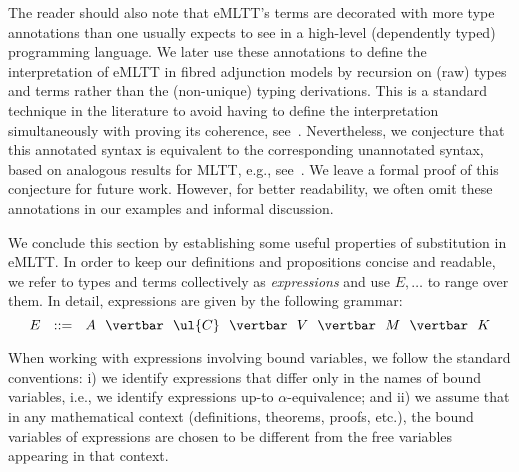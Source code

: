The reader should also note that eMLTT's terms are decorated with more type annotations than one usually expects to see in a high-level (dependently typed) programming language. We later use these annotations to define the interpretation of eMLTT in fibred adjunction models by recursion on (raw) types and terms rather than the (non-unique) typing derivations. This is a standard technique in the literature  to avoid having to define the interpretation  simultaneously with proving its coherence, see~\cite{Streicher:Semantics,Hofmann:SyntaxAndSemantics}.
%
Nevertheless, we conjecture that this annotated syntax is equivalent to the corresponding unannotated syntax, based on analogous results for MLTT, e.g., see~\cite{Streicher:Semantics,Castellan:Report}. We leave a formal proof of this conjecture for future work. However, for better readability, we often omit these annotations in our examples and informal discussion.


We conclude this section by establishing some useful properties of substitution in eMLTT. 
In order to keep our definitions and propositions concise and readable, we refer to types and terms collectively as \emph{expressions} and use $E, \ldots$ to range over them. In detail, expressions are given by the following grammar:
\[
E \,\,\,\,::=\,\,\,\, A \,\,\,\,\vertbar\,\,\,\, \ul{C} \,\,\,\,\vertbar\,\,\,\, V \,\,\,\,\vertbar\,\,\,\, M \,\,\,\,\vertbar\,\,\,\, K
\]

When working with expressions involving bound variables, we follow the standard conventions:
%
i) we identify expressions that differ only in the names of bound variables, i.e., we identify expressions up-to $\alpha$-equivalence; and ii) we assume that in any mathematical context (definitions, theorems, proofs, etc.), the bound variables of expressions are chosen to be different from the free variables appearing in that context.

